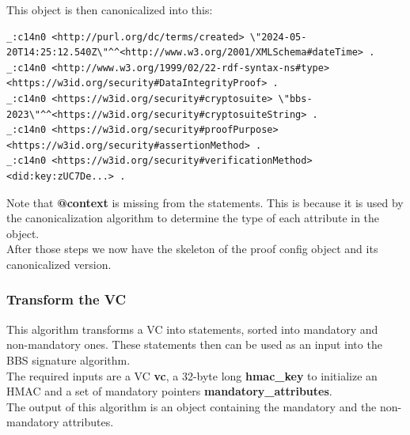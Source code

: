 \documentclass[
	a4paper               %
	,BCOR=0mm            %
	,bibliography=totoc   %
	,listof=totoc         %
	,monolingual
	,twoside=false
]{bfhthesis}              %
\begin{document}
This object is then canonicalized into this:
\begin{lstlisting}[language=canon,firstnumber=1,caption={Example Proof Config canonicalized},captionpos=b]
_:c14n0 <http://purl.org/dc/terms/created> \"2024-05-20T14:25:12.540Z\"^^<http://www.w3.org/2001/XMLSchema#dateTime> .
_:c14n0 <http://www.w3.org/1999/02/22-rdf-syntax-ns#type> <https://w3id.org/security#DataIntegrityProof> .
_:c14n0 <https://w3id.org/security#cryptosuite> \"bbs-2023\"^^<https://w3id.org/security#cryptosuiteString> .
_:c14n0 <https://w3id.org/security#proofPurpose> <https://w3id.org/security#assertionMethod> .
_:c14n0 <https://w3id.org/security#verificationMethod> <did:key:zUC7De...> .
\end{lstlisting}

Note that \textbf{@context} is missing from the statements.
This is because it is used by the canonicalization algorithm to determine the type of each attribute in the object.\\

After those steps we now have the skeleton of the proof config object and its canonicalized version.

\subsubsection{Transform the VC}
\label{sub:transformvc}
This algorithm transforms a VC into statements, sorted into mandatory and \\non-mandatory ones. These statements then can be used as an input into the BBS signature algorithm.\\

The required inputs are a VC \textbf{vc}, a 32-byte long \textbf{hmac\_key} to initialize an HMAC and a set of mandatory pointers \textbf{mandatory\_attributes}.\\

The output of this algorithm is an object containing the mandatory and the non-mandatory attributes.\\
\end{document}
